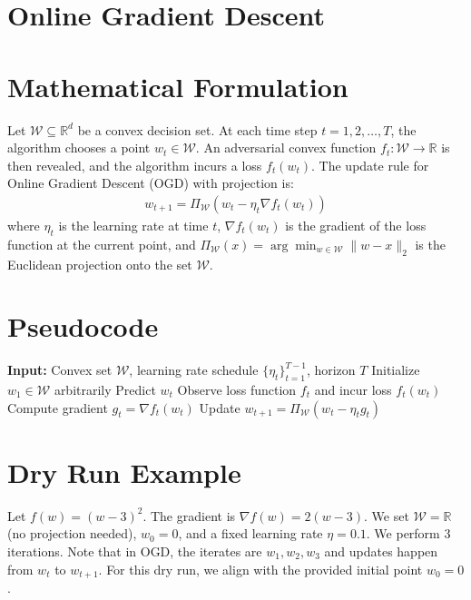 \documentclass{article}
\begin{document}
\section*{Online Gradient Descent}

\section*{Mathematical Formulation}
Let $\mathcal{W} \subseteq \mathbb{R}^d$ be a convex decision set. At each time step $t = 1, 2, \dots, T$, the algorithm chooses a point $w_t \in \mathcal{W}$. An adversarial convex function $f_t : \mathcal{W} \to \mathbb{R}$ is then revealed, and the algorithm incurs a loss $f_t(w_t)$. The update rule for Online Gradient Descent (OGD) with projection is:
\begin{align*}
w_{t+1} = \Pi_{\mathcal{W}} \left( w_t - \eta_t \nabla f_t(w_t) \right)
\end{align*}
where $\eta_t$ is the learning rate at time $t$, $\nabla f_t(w_t)$ is the gradient of the loss function at the current point, and $\Pi_{\mathcal{W}}(x) = \arg\min_{w \in \mathcal{W}} \|w - x\|_2$ is the Euclidean projection onto the set $\mathcal{W}$.

\section*{Pseudocode}
\begin{algorithm}[H]
\caption{Online Gradient Descent (OGD)}
\begin{algorithmic}[1]
\STATE \textbf{Input:} Convex set $\mathcal{W}$, learning rate schedule $\{\eta_t\}_{t=1}^{T-1}$, horizon $T$
\STATE Initialize $w_1 \in \mathcal{W}$ arbitrarily
\STATE Predict $w_t$
\STATE Observe loss function $f_t$ and incur loss $f_t(w_t)$
\STATE Compute gradient $g_t = \nabla f_t(w_t)$
\STATE Update $w_{t+1} = \Pi_{\mathcal{W}} \left( w_t - \eta_t g_t \right)$
\ENDFOR
\end{algorithmic}
\end{algorithm}

\section*{Dry Run Example}
Let $f(w) = (w - 3)^2$. The gradient is $\nabla f(w) = 2(w - 3)$. 
We set $\mathcal{W} = \mathbb{R}$ (no projection needed), $w_0 = 0$, and a fixed learning rate $\eta = 0.1$. We perform 3 iterations. Note that in OGD, the iterates are $w_1, w_2, w_3$ and updates happen from $w_t$ to $w_{t+1}$. For this dry run, we align with the provided initial point $w_0=0$.
\end{document}

